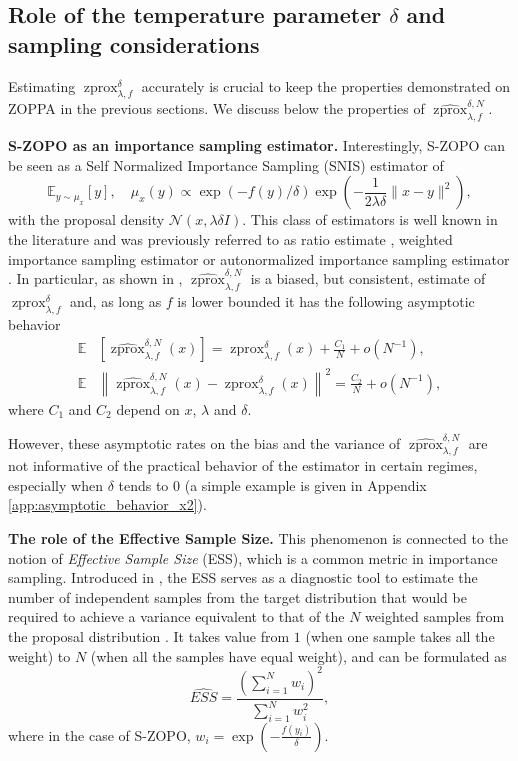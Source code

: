 \documentclass{article}
\newcommand{\zprox}{\ensuremath{\operatorname{zprox}}}
\newcommand{\szprox}{\ensuremath{\widehat{\operatorname{zprox}}}}
\begin{document}
\subsection{Role of the temperature parameter $\delta$ and sampling considerations}\label{sec:sampling_challenges}

Estimating \(\zprox^{\delta}_{\lambda, f}\) accurately is crucial to keep the properties demonstrated on ZOPPA in the previous sections. We discuss below the properties of \(\szprox^{\delta,N}_{\lambda, f}\).

\textbf{S-ZOPO as an importance sampling estimator.} Interestingly, S-ZOPO can be seen as a Self Normalized Importance Sampling (SNIS) estimator \cite{deligiannidis2024importance} of \[\mathbb{E}_{y\sim\mu_x}[y],\quad \mu_x(y)\propto\exp(-f(y)/\delta)\exp(-\frac{1}{2\lambda\delta}\|x-y\|^2),\]
with the proposal density \(\mathcal{N}(x,\lambda\delta I)\). This class of estimators is well known in the literature and was previously referred to as ratio estimate \cite{hesterberg1988advances}, weighted importance sampling estimator \cite{lemieux2009monte, rubinstein2016simulation} or autonormalized importance sampling estimator \cite{agapiou2017importance}. In particular, as shown in \cite[Section~2.5.2]{hesterberg1988advances}, \(\szprox^{\delta,N}_{\lambda, f}\) is a biased, but consistent, estimate of \(\zprox^{\delta}_{\lambda, f}\) and, as long as \(f\) is lower bounded it has the following asymptotic behavior
\begin{equation}\begin{aligned}
\mathbb{E}&\left[\szprox^{\delta,N}_{\lambda, f}(x)\right]=\zprox^{\delta}_{\lambda, f}(x)+\frac{C_1}{N}+o(N^{-1}),\\
\mathbb{E}&\left\|\szprox^{\delta,N}_{\lambda, f}(x)-\zprox^{\delta}_{\lambda, f}(x)\right\|^2=\frac{C_2}{N}+o(N^{-1}),
\end{aligned}
\end{equation}
where \(C_1\) and \(C_2\) depend on \(x\), \(\lambda\) and \(\delta\).

However, these asymptotic rates on the bias and the variance of \(\szprox^{\delta,N}_{\lambda, f}\) are not informative of the practical behavior of the estimator in certain regimes, especially when \(\delta\) tends to \(0\) (a simple example is given in Appendix \ref{app:asymptotic_behavior_x2}).

\textbf{The role of the Effective Sample Size.} This phenomenon is connected to the notion of \emph{Effective Sample Size} (ESS), which is a common metric in importance sampling. Introduced in \cite{kish1965survey}, the ESS serves as a diagnostic tool to estimate the number of independent samples from the target distribution that would be required to achieve a variance equivalent to that of the \(N\) weighted samples from the proposal distribution \cite{kong1992note,liu1996metropolized}. It takes value from \(1\) (when one sample takes all the weight) to \(N\) (when all the samples have equal weight), and can be formulated as
\begin{equation}
    \widehat{ESS} = \frac{\left(\sum_{i=1}^N w_i \right)^2}{\sum_{i=1}^N w_i^2},
\end{equation}
where in the case of S-ZOPO, \(w_i=\exp\left(-\frac{f(y_i)}{\delta}\right)\).
\end{document}

